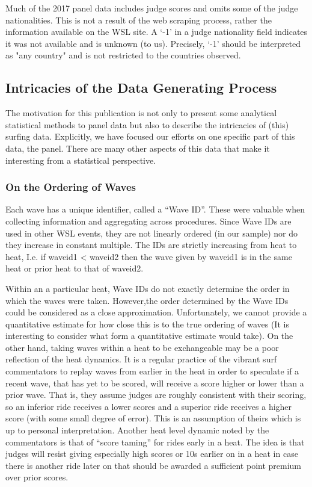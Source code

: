 \documentclass{article}
\begin{document}
Much of the 2017 panel data includes judge scores and omits some of the judge nationalities. This is not a result of the web scraping process, rather the information available on the WSL site. A ‘-1’ in a judge nationality field indicates it was not available and is unknown (to us). Precisely, ‘-1’ should be interpreted as "any country" and is not restricted to the countries observed.

\subsection{Intricacies of the Data Generating Process}
The motivation for this publication is not only to present some analytical statistical methods to panel data but also to describe the intricacies of (this) surfing data. Explicitly, we have focused our efforts on one specific part of this data, the panel. There are many other aspects of this data that make it interesting from a statistical perspective.

\subsubsection{On the Ordering of Waves}
Each wave has a unique identifier, called a “Wave ID”. These were valuable when collecting information and aggregating across procedures. Since Wave IDs are used in other WSL events, they are not linearly ordered (in our sample) nor do they increase in constant multiple. The IDs are strictly increasing from heat to heat, I.e. if waveid1 < waveid2 then the wave given by waveid1 is in the same heat or prior heat to that of waveid2. 

Within an a particular heat, Wave IDs do not exactly determine the order in which the waves were taken. However,the order determined by the Wave IDs could be considered as a close approximation. Unfortunately, we cannot provide a quantitative estimate for how close this is to the true ordering of waves (It is interesting to consider what form a quantitative estimate would take).
On the other hand, taking waves within a heat to be exchangeable may be a poor reflection of the heat dynamics. It is a regular practice of the vibrant surf commentators to replay waves from earlier in the heat in order to speculate if a recent wave, that has yet to be scored, will receive a score higher or lower than a prior wave. That is, they assume judges are roughly consistent with their scoring, so an inferior ride receives a lower scores and a superior ride receives a higher score (with some small degree of error). This is an assumption of theirs which is up to personal interpretation. Another heat level dynamic noted by the commentators is that of “score taming” for rides early in a heat. The idea is that judges will resist giving especially high scores or 10s earlier on in a heat in case there is another ride later on that should be awarded a sufficient point premium over prior scores.
\end{document}
